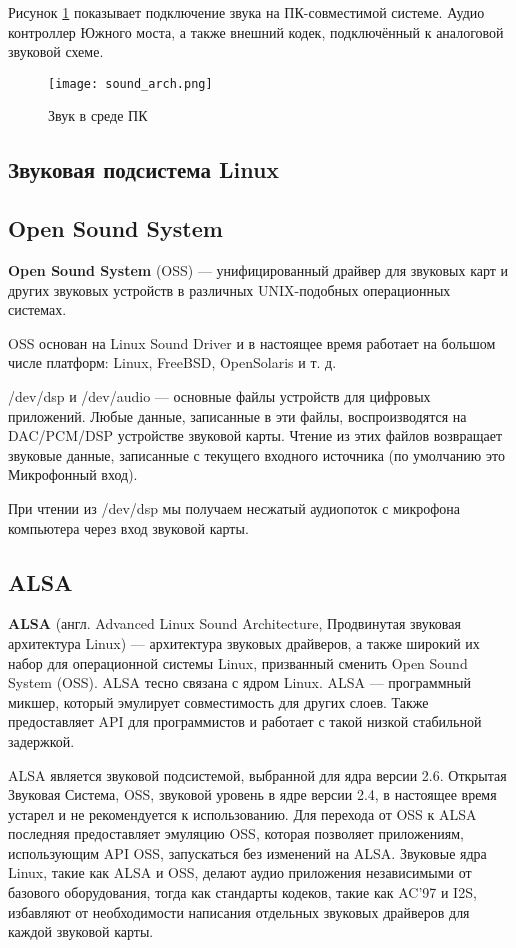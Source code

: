 Рисунок \ref{image:sound_arch} показывает подключение звука на ПК-совместимой системе. Аудио контроллер Южного моста, а также внешний кодек, подключённый к аналоговой звуковой схеме. \cite{eldd}

\begin{figure}[h]
  \centering
  \texttt{[image: sound\_arch.png]}
  \caption{Звук в среде ПК}
  \label{image:sound_arch}
\end{figure}

\subsection{Звуковая подсистема Linux}

\subsection{Open Sound System}
\textbf{Open Sound System} (OSS) — унифицированный драйвер для звуковых карт и других звуковых устройств в различных UNIX-подобных операционных системах.

OSS основан на Linux Sound Driver и в настоящее время работает на большом числе платформ: Linux, FreeBSD, OpenSolaris и т. д. \cite{wiki-oss}

/dev/dsp и /dev/audio — основные файлы устройств для цифровых приложений. Любые данные, записанные в эти файлы, воспроизводятся на DAC/PCM/DSP устройстве звуковой карты. Чтение из этих файлов возвращает звуковые данные, записанные с текущего входного источника (по умолчанию это Микрофонный вход).

При чтении из /dev/dsp мы получаем несжатый аудиопоток с микрофона компьютера через вход звуковой карты. 

\subsection{ALSA}

\textbf{ALSA} (англ. Advanced Linux Sound Architecture, Продвинутая звуковая архитектура Linux) — архитектура звуковых драйверов, а также широкий их набор для операционной системы Linux, призванный сменить Open Sound System (OSS). ALSA тесно связана с ядром Linux. ALSA — программный микшер, который эмулирует совместимость для других слоев. Также предоставляет API для программистов и работает с такой низкой стабильной задержкой. \cite{wiki-alsa}

ALSA является звуковой подсистемой, выбранной  для ядра версии 2.6. Открытая Звуковая Система, OSS, звуковой уровень в ядре версии 2.4, в настоящее время устарел и не рекомендуется к использованию. Для перехода от OSS к ALSA последняя предоставляет эмуляцию OSS, которая позволяет приложениям, использующим API OSS, запускаться без изменений на ALSA. Звуковые ядра Linux, такие как ALSA и OSS, делают аудио приложения независимыми от базового оборудования, тогда как стандарты кодеков, такие как AC'97 и I2S, избавляют от необходимости написания отдельных звуковых драйверов для каждой звуковой карты.

